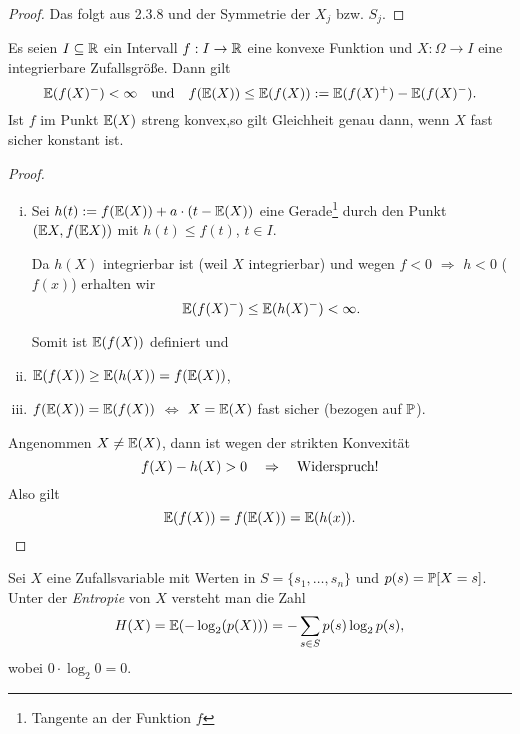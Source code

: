 \begin{proof}
  Das folgt aus 2.3.8 und der Symmetrie der $X_j$ bzw. $S_j$.
\end{proof}

\begin{thm}
  Es seien $I \subseteq \mathbb{R}$ ein Intervall $f: I \to \mathbb{R}$ eine konvexe
  Funktion und $X: \Omega \to I$ eine integrierbare Zufallsgröße\footnotemark.
  Dann gilt 
  \[ \mathbb{E}( f(X)^- ) < \infty \quad \text{und} \quad
    f(\mathbb{E}(X)) \le \mathbb{E}(f(X)) := \mathbb{E}(f(X)^+) - \mathbb{E}(f(X)^-).  \]
  Ist $f$ im Punkt $\mathbb{E}(X)$ streng konvex,so gilt Gleichheit genau dann, wenn
  $X$ fast sicher konstant ist.
\end{thm}

\begin{proof}
  \begin{enumerate}[i)]
  \item Sei $h(t) := f(\mathbb{E}(X)) + a \cdot (t - \mathbb{E}(X))$ eine Gerade\footnote{%
      Tangente an der Funktion $f$}
    durch den Punkt $(\mathbb{E} X, f(\mathbb{E} X))$ mit $h(t) \le f(t)$, $t \in I$.

    Da $h(X)$ integrierbar ist (weil $X$ integrierbar) und wegen $f < 0$
    $\Rightarrow$ $h < 0$ ($f(x)$) erhalten wir
    \[ \mathbb{E}( f(X)^-) \le \mathbb{E}(h(X)^-) < \infty. \]

    Somit ist $\mathbb{E}(f(X))$ definiert und
  \item $\mathbb{E}(f(X)) \ge \mathbb{E}(h(X)) = f(\mathbb{E}(X))$,
  \item $f(\mathbb{E}(X)) = \mathbb{E}(f(X))$ $\Leftrightarrow$ $X = \mathbb{E}(X)$ fast sicher
    (bezogen auf $\mathbb{P}$).
  \end{enumerate}
  Angenommen $X \ne \mathbb{E}(X)$, dann ist wegen der strikten Konvexität
  \[ f(X) - h(X) > 0 \quad \Rightarrow \quad \text{Widerspruch!} \]
  Also gilt
  \[ \mathbb{E}(f(X)) = f(\mathbb{E}(X)) = \mathbb{E}(h(x)). \qedhere \]
\end{proof}

\begin{defn}
  Sei $X$ eine Zufallsvariable mit Werten in $S = \{s_1, \ldots, s_n\}$ und
  $p(s) = \mathbb{P}[X=s]$. Unter der \emph{Entropie} von $X$ versteht man die Zahl
  \[ H(X) = \mathbb{E}(-\log_2(p(X))) = - \sum_{s \in S} p(s) \log_2 p(s), \]
  wobei $0 \cdot \log_2 0 = 0$.
\end{defn}